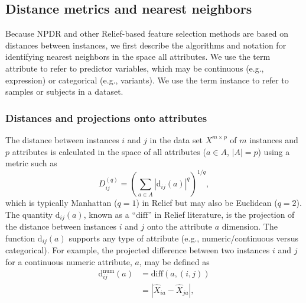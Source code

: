 \documentclass{bioinfo}
\begin{document}
\subsection{Distance metrics and nearest neighbors}\label{sec:reform}
Because NPDR and other Relief-based feature selection methods are based on distances between instances, we first describe the algorithms and notation for identifying nearest neighbors in the space all attributes.
We use the term attribute to refer to predictor variables, which may be continuous (e.g., expression) or categorical (e.g., variants).
We use the term instance to refer to samples or subjects in a dataset.

\subsubsection{Distances and projections onto attributes}
The distance between instances $i$ and $j$ in the data set $X^{m \times p}$ of $m$ instances and $p$ attributes is calculated in the space of all attributes ($a \in A$, $|A|=p$) using a metric such as
\begin{equation}\label{eq:D}
D^{(q)}_{ij}=\left(\sum_{a\in A}|\text{d}_{ij}(a)|^q\right)^{1/q},
\end{equation}
which is typically Manhattan ($q=1$) in Relief but may also be Euclidean ($q=2$).
The quantity 
$\text{d}_{ij}(a)$,
known as a ``$\text{diff}$'' in Relief literature, is the projection of the distance between instances $i$ and $j$ onto the attribute $a$ dimension.
The function $\text{d}_{ij}(a)$ supports any type of attribute (e.g., numeric/continuous versus categorical).
For example, the projected difference between two instances $i$ and $j$ for a continuous numeric attribute, $a$, may be defined as
\begin{equation}\label{eq:diff}
\begin{aligned}
\text{d}^{\text{num}}_{ij}(a)&=\text{diff}(a,(i,j))\\
                                            & = {|\hat{X}_{ia}-\hat{X}_{ja}|},
\end{aligned}
\end{equation}
\end{document}
